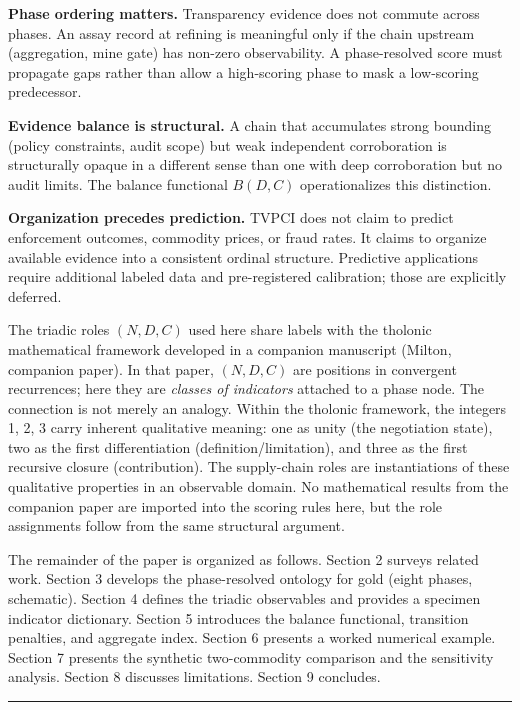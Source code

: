 \documentclass[
  11pt,
  letterpaper,
]{article}
\begin{document}
\textbf{Phase ordering matters.} Transparency evidence does not commute
across phases. An assay record at refining is meaningful only if the
chain upstream (aggregation, mine gate) has non-zero observability. A
phase-resolved score must propagate gaps rather than allow a
high-scoring phase to mask a low-scoring predecessor.

\textbf{Evidence balance is structural.} A chain that accumulates strong
bounding (policy constraints, audit scope) but weak independent
corroboration is structurally opaque in a different sense than one with
deep corroboration but no audit limits. The balance functional
\(B(D,C)\) operationalizes this distinction.

\textbf{Organization precedes prediction.} TVPCI does not claim to
predict enforcement outcomes, commodity prices, or fraud rates. It
claims to organize available evidence into a consistent ordinal
structure. Predictive applications require additional labeled data and
pre-registered calibration; those are explicitly deferred.

The triadic roles \((N, D, C)\) used here share labels with the tholonic
mathematical framework developed in a companion manuscript (Milton,
companion paper). In that paper, \((N, D, C)\) are positions in
convergent recurrences; here they are \emph{classes of indicators}
attached to a phase node. The connection is not merely an analogy.
Within the tholonic framework, the integers 1, 2, 3 carry inherent
qualitative meaning: one as unity (the negotiation state), two as the
first differentiation (definition/limitation), and three as the first
recursive closure (contribution). The supply-chain roles are
instantiations of these qualitative properties in an observable domain.
No mathematical results from the companion paper are imported into the
scoring rules here, but the role assignments follow from the same
structural argument.

The remainder of the paper is organized as follows. Section 2 surveys
related work. Section 3 develops the phase-resolved ontology for gold
(eight phases, schematic). Section 4 defines the triadic observables and
provides a specimen indicator dictionary. Section 5 introduces the
balance functional, transition penalties, and aggregate index. Section 6
presents a worked numerical example. Section 7 presents the synthetic
two-commodity comparison and the sensitivity analysis. Section 8
discusses limitations. Section 9 concludes.

\begin{center}\rule{0.5\linewidth}{0.5pt}\end{center}
\end{document}

